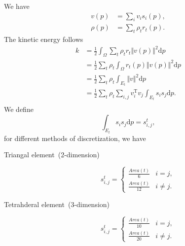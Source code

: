 \documentclass{fancydoc}
\newcommand{\trans}{\mathrm{T}}
\newcommand{\diffd}{\mathrm{d}}
\begin{document}
We have
\begin{subequations}
\begin{align}
v(p) &=\sum_i v_i s_i(p), \\
\rho(p) &= \sum_t \rho_t r_t(p).
\end{align}
\end{subequations}
The kinetic energy follows
\begin{subequations}
	\begin{align}
	k &= \frac{1}{2} \int_\Omega \sum_t \rho_t r_t \Vert v(p)\Vert^2 \diffd p\\
	  &= \frac{1}{2} \sum_t \rho_t \int_\Omega r_t(p) \Vert v(p) \Vert^2 \diffd p\\
	  &= \frac{1}{2} \sum_t \rho_t \int_{E_t} \Vert v \Vert^2 \diffd p \\
	  &= \frac{1}{2} \sum_t \rho_t \sum_{i,j} v_i^\trans v_j \int_{E_t} s_i s_j \diffd p.\\
	\end{align}
\end{subequations}
We define
\begin{equation}
\int_{E_t} s_i s_j \diffd p = s_{i, j}^t,
\end{equation}
for different methods of discretization, we have
\begin{description}
	\item[Triangal element~(2-dimension)] \[s^t_{i,j} = \begin{cases}
	\frac{Area(t)}{6} & i = j, \\
	\frac{Area(t)}{12} & i \neq j.
	\end{cases}\]
	\item[Tetrahderal element~(3-dimension)] \[s^t_{i,j} = \begin{cases}
	\frac{Area(t)}{10} & i = j, \\
	\frac{Area(t)}{20} & i \neq j.
	\end{cases}\]
\end{description}
\end{document}
